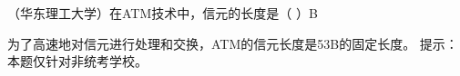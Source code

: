 \question （华东理工大学）在ATM技术中，信元的长度是（ ）B
\par{}
\begin{solution}为了高速地对信元进行处理和交换，ATM的信元长度是53B的固定长度。
提示：本题仅针对非统考学校。
\end{solution}
